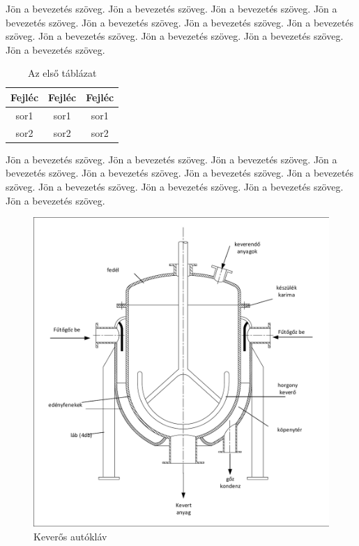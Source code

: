 \documentclass[a4paper,12pt,oneside]{book}
\begin{document}
Jön a bevezetés szöveg. Jön a bevezetés szöveg. Jön a bevezetés szöveg. Jön a bevezetés szöveg. Jön a bevezetés szöveg. Jön a bevezetés szöveg. Jön a bevezetés szöveg. Jön a bevezetés szöveg. Jön a bevezetés szöveg. Jön a bevezetés szöveg. Jön a bevezetés szöveg.

\begin{table}[H]
	\centering \renewcommand{\arraystretch}{1.2}
	\caption{Az első táblázat}
	\begin{tabular}{|c|c|c|} \hline
		Fejléc&Fejléc&Fejléc\\ \hline
		sor1&sor1&sor1\\ \hline
		sor2&sor2&sor2\\ \hline	
	\end{tabular}
	\label{tabla1}
\end{table}

Jön a bevezetés szöveg. Jön a bevezetés szöveg. Jön a bevezetés szöveg. Jön a bevezetés szöveg. Jön a bevezetés szöveg. Jön a bevezetés szöveg. Jön a bevezetés szöveg. Jön a bevezetés szöveg. Jön a bevezetés szöveg. Jön a bevezetés szöveg. Jön a bevezetés szöveg.

\begin{figure}[H]
	\centering
	\includegraphics[scale=1, trim=1mm 1mm 1mm 1mm, clip]{kep1}
	\caption{Keverős autókláv}
	\label{kep1356}
\end{figure}
\end{document}
